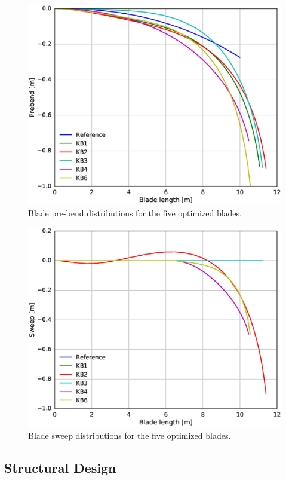 \begin{figure}[!ht]
\begin{center}
	\includegraphics[width=.85\linewidth]{figures/KBcomp_prebend.eps}
\end{center}
\caption{Blade pre-bend distributions for the five optimized blades.}
\label{fig:prebend}
\end{figure}

\begin{figure}[!ht]
\begin{center}
	\includegraphics[width=.85\linewidth]{figures/KBcomp_sweep.eps}
\end{center}
\caption{Blade sweep distributions for the five optimized blades.}
\label{fig:sweep}
\end{figure}

\subsection{Structural Design}

